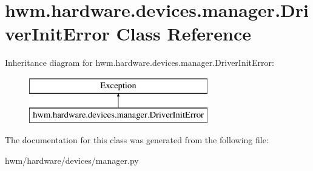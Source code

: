 \hypertarget{classhwm_1_1hardware_1_1devices_1_1manager_1_1_driver_init_error}{\section{hwm.\-hardware.\-devices.\-manager.\-Driver\-Init\-Error Class Reference}
\label{classhwm_1_1hardware_1_1devices_1_1manager_1_1_driver_init_error}
}
Inheritance diagram for hwm.\-hardware.\-devices.\-manager.\-Driver\-Init\-Error\-:\begin{figure}[H]
\begin{center}
\leavevmode
\includegraphics[height=2.000000cm]{classhwm_1_1hardware_1_1devices_1_1manager_1_1_driver_init_error}
\end{center}
\end{figure}


The documentation for this class was generated from the following file\-:\begin{DoxyCompactItemize}
\item 
hwm/hardware/devices/manager.\-py\end{DoxyCompactItemize}
